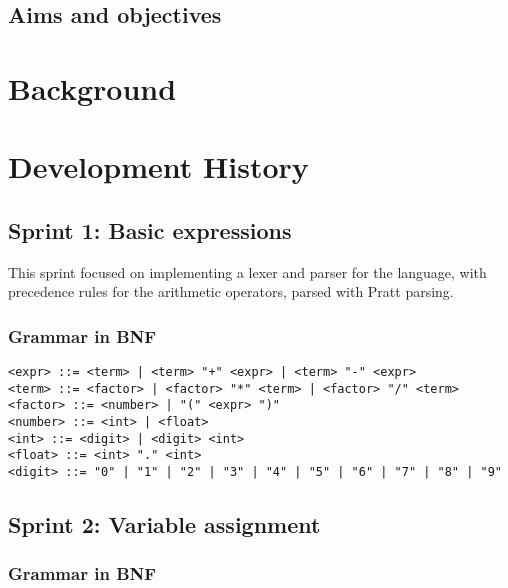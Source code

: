 \documentclass[a4paper, oneside, 11pt]{report}
\begin{document}
\section{Aims and objectives}\label{sec:aims-and-objectives}

\chapter{Background}\label{ch:background}

\chapter{Development History}\label{ch:devhist}

\section{Sprint 1: Basic expressions}\label{sec:sprint-1:-basic-expressions}

This sprint focused on implementing a lexer and parser for the language, with precedence rules for the arithmetic 
operators, parsed with Pratt parsing.

\subsection{Grammar in BNF}\label{subsec:grammar-in-bnf1}

\begin{verbatim}
<expr> ::= <term> | <term> "+" <expr> | <term> "-" <expr>
<term> ::= <factor> | <factor> "*" <term> | <factor> "/" <term>
<factor> ::= <number> | "(" <expr> ")"
<number> ::= <int> | <float>
<int> ::= <digit> | <digit> <int>
<float> ::= <int> "." <int>
<digit> ::= "0" | "1" | "2" | "3" | "4" | "5" | "6" | "7" | "8" | "9"
\end{verbatim}

\section{Sprint 2: Variable assignment}\label{sec:variable-assignment}

\subsection{Grammar in BNF}\label{subsec:grammar-in-bnf2}
\end{document}
